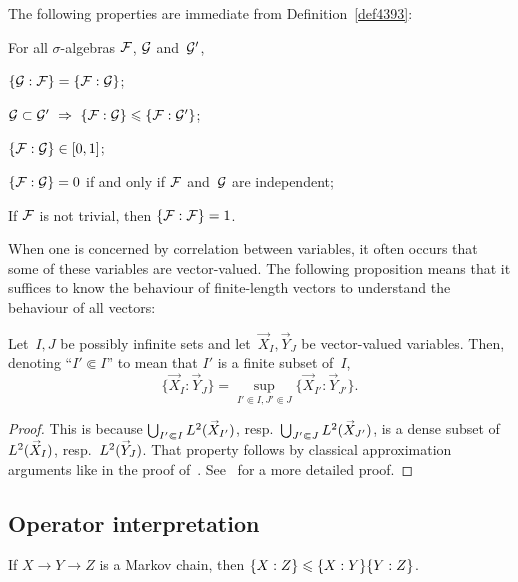 The following properties are immediate from Definition~\ref{def4393}:
%
\begin{Pro}
For all $\sigma$-algebras $\mathcal{F}$, $\mathcal{G}$ and~$\mathcal{G}'$,
\begin{ienumerate}
\item $\{\mathcal{G}:\mathcal{F}\} = \{\mathcal{F}:\mathcal{G}\}$;
\item $\mcal{G}\subset\mcal{G}' \ \Rightarrow\ \{\mcal{F}:\mcal{G}\} \leq \{\mcal{F}:\mcal{G}'\}$;
\item $\{\mathcal{F}:\mathcal{G}\} \in [0,1]$;
\item $\{\mathcal{F}:\mathcal{G}\} = 0$ if and only if $\mathcal{F}$ and~$\mathcal{G}$ are independent;
\item If $\mathcal{F}$ is not trivial, then $\{\mathcal{F}:\mathcal{F}\} = 1$.
\end{ienumerate}
\end{Pro}

When one is concerned by correlation between variables,
it often occurs that some of these variables are vector-valued.
The following proposition means
that it suffices to know the behaviour of finite-length vectors
to understand the behaviour of all vectors:
%
\begin{Pro}\label{pro6559}
Let~$I, J$ be possibly infinite sets
and let~$\vec{X}_I, \vec{Y}_J$ be vector-valued variables. Then,
denoting ``$I'\Subset I$'' to mean that $I'$ is a finite subset of~$I$,
\[ \big\{ \vec{X}_I : \vec{Y}_J \big\} =
\sup_{I'\Subset I,J'\Subset J}
\big\{ \vec{X}_{I'} : \vec{Y}_{J'} \big\} .\]
\end{Pro}

\begin{proof}
This is because $\bigcup_{I'\Subset I} \ldb(\vec{X}_{I'})$,
resp.~$\bigcup_{J'\Subset J} \ldb(\vec{X}_{J'})$,
is a dense subset of~$\ldb(\vec{X}_I)$, resp.\ $\ldb(\vec{Y}_J)$.
That property follows by classical approximation arguments
like in the proof of~\cite[Theorem~3.14]{Rudin}.
See~\cite[Theorem~3.16(II-3)]{Bradley-book} for a more detailed proof.
\end{proof}



\subsection{Operator interpretation}\label{parOperatorInterpretation}

\begin{Pro}\label{cor0706}
If $X \to Y \to Z$ is a Markov chain, then $\{X:Z\} \leq {\{X:Y\}} \* {\{Y:Z\}}$.
\end{Pro}

